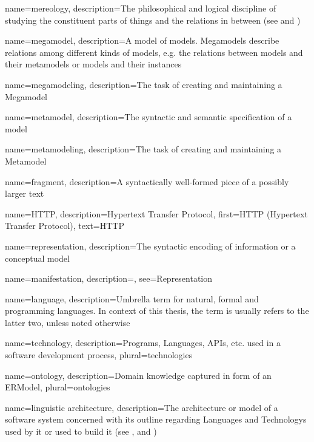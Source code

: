 {
    name={mereology},
    description={The philosophical and logical discipline of studying the constituent parts of things and the relations in between (see \cite{DBLP:journals/dke/Varzi96} and \cite{SEP:Mereology})}
}

{
    name={megamodel},
    description={A model of models. Megamodels describe relations among different kinds of models, e.g. the relations between models and their metamodels or models and their instances}
}

{
    name={megamodeling},
    description={The task of creating and maintaining a \gls{Megamodel}}
}

{
    name={metamodel},
    description={The syntactic and semantic specification of a model}
}

{
    name={metamodeling},
    description={The task of creating and maintaining a \gls{Metamodel}}
}

{
    name={fragment},
    description={A syntactically well-formed piece of a possibly larger text}
}

{
    name=HTTP,
    description={Hypertext Transfer Protocol},
    first={HTTP (Hypertext Transfer Protocol)},
    text={HTTP}
}

{
    name={representation},
    description={The syntactic encoding of information or a conceptual model}
}

{
    name={manifestation},
    description={},
    see={Representation}   
}

{
    name={language},
    description={Umbrella term for natural, formal and programming languages. In context of this thesis, the term is usually refers to the latter two, unless noted otherwise}
}

{
    name={technology},
    description={Programs, \glspl{Language}, \glspl{API}, etc. used in a software development process},
    plural={technologies}
}

{
    name={ontology},
    description={Domain knowledge captured in form of an \gls{ERModel}},
    plural={ontologies}
}


{
    name={linguistic architecture},
    description={The architecture or model of a software system concerned with its outline regarding \glspl{Language} and \glspl{Technology} used by it or used to build it (see  \cite{DBLP:conf/models/FavreLV12}, \cite{DBLP:conf/ecmdafa/LammelV14} and \cite{DBLP:conf/modelsward/HeinzLV17})}
}

